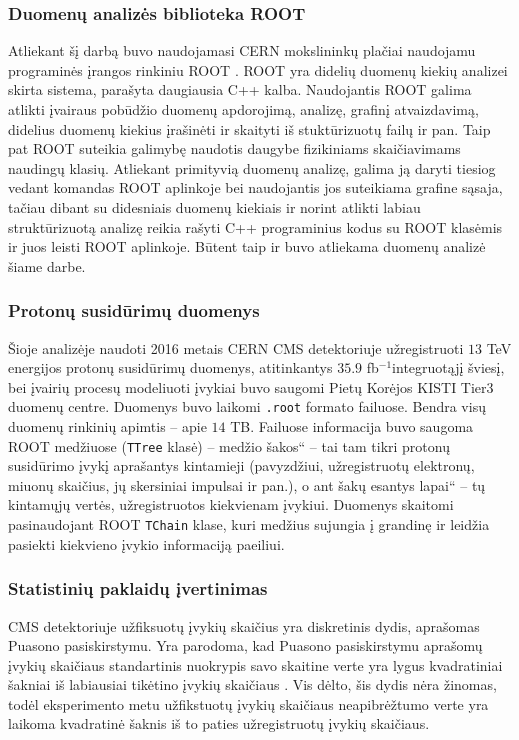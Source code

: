 \documentclass[a4paper, 12pt]{article}
\newcommand{\ttt}[1]{\texttt{#1}}
\newcommand{\ltq}[1]{{\quotedblbase{}#1\textquotedblleft{}}}
\newcommand{\invfb}{fb$^{-1}$}
\newlength\q
\begin{document}
\subsubsection{Duomenų analizės biblioteka ROOT}

Atliekant šį darbą buvo naudojamasi CERN mokslininkų plačiai naudojamu programinės įrangos rinkiniu ROOT \cite{ROOT}.
ROOT yra didelių duomenų kiekių analizei skirta sistema, parašyta daugiausia C++ kalba.
Naudojantis ROOT galima atlikti įvairaus pobūdžio duomenų apdorojimą, analizę, grafinį atvaizdavimą, didelius duomenų
kiekius įrašinėti ir skaityti iš stuktūrizuotų failų ir pan.
Taip pat ROOT suteikia galimybę naudotis daugybe fizikiniams skaičiavimams naudingų klasių.
Atliekant primityvią duomenų analizę, galima ją daryti tiesiog vedant komandas ROOT aplinkoje bei naudojantis jos
suteikiama grafine sąsaja, tačiau dibant su didesniais duomenų kiekiais ir norint atlikti labiau struktūrizuotą analizę
reikia rašyti C++ programinius kodus su ROOT klasėmis ir juos leisti ROOT aplinkoje.
Būtent taip ir buvo atliekama duomenų analizė šiame darbe.

\subsubsection{Protonų susidūrimų duomenys}\label{sec:data}

Šioje analizėje naudoti 2016 metais CERN CMS detektoriuje užregistruoti $13$ TeV energijos protonų susidūrimų duomenys,
atitinkantys $35.9$ \invfb integruotąjį šviesį, bei įvairių procesų modeliuoti įvykiai buvo saugomi Pietų Korėjos KISTI
Tier3 duomenų centre.
Duomenys buvo laikomi \ttt{.root} formato failuose.
Bendra visų duomenų rinkinių apimtis -- apie $14$ TB.
Failuose informacija buvo saugoma ROOT medžiuose (\ttt{TTree} klasė) -- medžio \ltq{šakos} -- tai tam tikri protonų
susidūrimo įvykį aprašantys kintamieji (pavyzdžiui, užregistruotų elektronų, miuonų skaičius, jų skersiniai impulsai ir pan.),
o ant šakų esantys \ltq{lapai} -- tų kintamųjų vertės, užregistruotos kiekvienam įvykiui.
Duomenys skaitomi pasinaudojant ROOT \ttt{TChain} klase, kuri medžius sujungia į grandinę ir leidžia pasiekti kiekvieno įvykio
informaciją paeiliui.

\subsubsection{Statistinių paklaidų įvertinimas}\label{sec:uncertainties}

CMS detektoriuje užfiksuotų įvykių skaičius yra diskretinis dydis, aprašomas Puasono pasiskirstymu.
Yra parodoma, kad Puasono pasiskirstymu aprašomų įvykių skaičiaus standartinis nuokrypis savo skaitine verte yra lygus
kvadratiniai šakniai iš labiausiai tikėtino įvykių skaičiaus \cite{Poisson}.
Vis dėlto, šis dydis nėra žinomas, todėl eksperimento metu užfikstuotų įvykių skaičiaus neapibrėžtumo verte yra laikoma
kvadratinė šaknis iš to paties užregistruotų įvykių skaičiaus.
\end{document}
